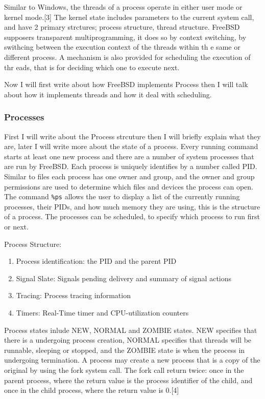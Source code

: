 \documentclass[letterpaper,10pt,draftclsnofoot,onecolumn]{IEEEtran}
\begin{document}
Similar to Windows, the threads of a process operate in either user mode or kernel mode.[3] The kernel state includes parameters to the current system call, and have 2 primary strctures;
 process structure, thread structure. FreeBSD supposers transparent multiprogramming, it does
 so by context switching, by swithcing between the execution context of the threads within th
e same or different process. A mechanism is also provided for scheduling the execution of thr
eads, that is for deciding which one to execute next.

Now I will first write about how FreeBSD implements Process then I will talk about how it implements threads and how it deal with scheduling.

\subsubsection*{Processes}

First I will write about the Process strcuture then I will briefly explain what they are, later I will write more about the state of a process. Every running command starts at least one new process and there are a number of system processes that are run by FreeBSD. Each process is uniquely identifies by a number called PID. Similar to files each process has one owner and group, and the owner and group permissions are used to determine which files and devices the process can open. The command \verb|%ps| allows the user to display a list of the currently running processes, their PIDs, and how much memory they are using, this is the structure of a process. The processes can be scheduled, to specify which process to run first or next.

Process Structure:
\begin{enumerate}
\item Process identification: the PID and the parent PID
\item Signal Slate: Signals pending delivery and summary of signal actions
\item Tracing: Process tracing information
\item Timers: Real-Time timer and CPU-utilization counters
\end{enumerate}

Process states inlude NEW, NORMAL and ZOMBIE states. NEW specifies that there is a undergoing process creation, NORMAL specifies that threads will be runnable, sleeping or stopped, and the ZOMBIE state is when the process in undergoing termination. A process may create a new process that is a copy of the original by using the fork system call. The fork call return twice: once in the parent process, where the return value is the process identifier of the child, and once in the child process, where the return value is 0.[4]
\end{document}

